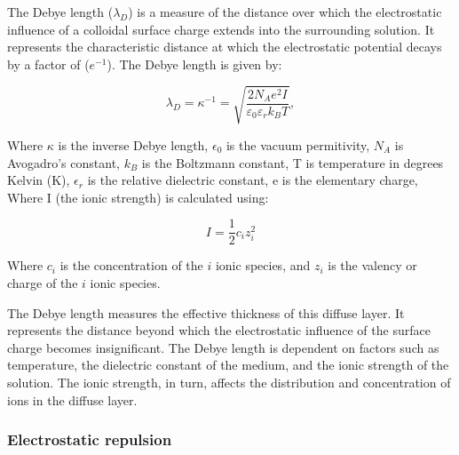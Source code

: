 The Debye length ($\lambda_D$) is a measure of the distance over which the electrostatic influence of a colloidal surface charge extends into the surrounding solution. It represents the characteristic distance at which the electrostatic potential decays by a factor of ($e^{-1}$). The Debye length is given by:

\begin{equation}
    \lambda_D = \kappa^{-1} = \sqrt{\frac{2 N_A e^2 I}{\varepsilon_0 \varepsilon_r k_B T}},
\end{equation}

Where $\kappa$ is the inverse Debye length,  $\epsilon_0$ is the vacuum permitivity, $N_A$ is Avogadro's constant, $k_B$ is the Boltzmann constant, T is temperature in degrees Kelvin (K), $\epsilon_r$ is the relative dielectric constant, e is the elementary charge, Where I (the ionic strength) is calculated using:

\begin{equation} 
I = \frac{1}{2} c_i z_i^2
\end{equation}

Where $c_i$ is the concentration of the $i$ ionic species, and $z_i$ is the valency or charge of the $i$ ionic species.

The Debye length measures the effective thickness of this diffuse layer. It represents the distance beyond which the electrostatic influence of the surface charge becomes insignificant. The Debye length is dependent on factors such as temperature, the dielectric constant of the medium, and the ionic strength of the solution. The ionic strength, in turn, affects the distribution and concentration of ions in the diffuse layer.



\subsubsection{Electrostatic repulsion}


